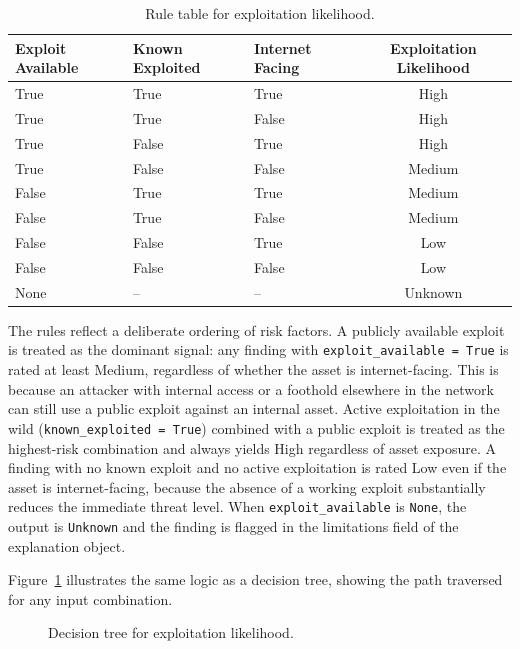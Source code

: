 \begin{table}[h]
\centering
\begin{tabular}{@{}lllc@{}}
\toprule
\textbf{Exploit Available} & \textbf{Known Exploited} & \textbf{Internet Facing} & \textbf{Exploitation Likelihood} \\
\midrule
True  & True  & True  & High \\
True  & True  & False & High \\
True  & False & True  & High \\
True  & False & False & Medium \\
False & True  & True  & Medium \\
False & True  & False & Medium \\
False & False & True  & Low \\
False & False & False & Low \\
None  & --    & --    & Unknown \\
\bottomrule
\end{tabular}
\caption{Rule table for exploitation likelihood.}
\label{tab:exploit-likelihood}
\end{table}

The rules reflect a deliberate ordering of risk factors. A publicly available exploit is treated as the dominant signal: any finding with \texttt{exploit\_available = True} is rated at least Medium, regardless of whether the asset is internet-facing. This is because an attacker with internal access or a foothold elsewhere in the network can still use a public exploit against an internal asset. Active exploitation in the wild (\texttt{known\_exploited = True}) combined with a public exploit is treated as the highest-risk combination and always yields High regardless of asset exposure. A finding with no known exploit and no active exploitation is rated Low even if the asset is internet-facing, because the absence of a working exploit substantially reduces the immediate threat level. When \texttt{exploit\_available} is \texttt{None}, the output is \texttt{Unknown} and the finding is flagged in the limitations field of the explanation object.

Figure~\ref{fig:tree-exploit} illustrates the same logic as a 
decision tree, showing the path traversed for any input combination.

\begin{figure}[h]
\centering
{}
\caption{Decision tree for exploitation likelihood.}
\label{fig:tree-exploit}
\end{figure}

